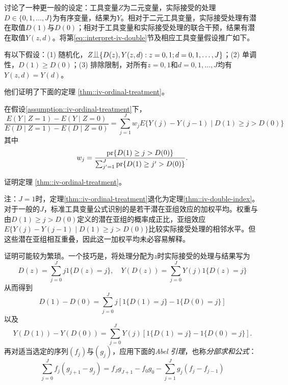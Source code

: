 \citet{angrist1995two}讨论了一种更一般的设定：工具变量$Z$为二元变量，实际接受的处理$D \in \{0,1,\ldots, J\}$为有序变量，结果为$Y$。相对于二元工具变量，实际接受处理有潜在取值$D(1)$与$D(0)$；相对于工具变量和实际接受处理的联合干预，结果有潜在取值$Y(z,d)$。将第\ref{eq::interpret-iv-double}节及相应工具变量假设推广如下。

\begin{assumption}\label{assumption::iv-ordinal-treatment}
有以下假设：(1) 随机化，$Z\ind \{   D(z),  Y(z,d)  : z=0,1; d = 0,1,\ldots, J \}$；(2) 单调性，$D(1) \geq D(0)$；(3) 排除限制，对所有$z=0,1$和$ d = 0,1,\ldots, J $均有$Y(z,d) = Y(d)$。 
\end{assumption}

他们证明了下面的定理 \ref{thm::iv-ordinal-treatment}。

\begin{theorem}\label{thm::iv-ordinal-treatment}
在假设\ref{assumption::iv-ordinal-treatment}下，
$$
\frac{  E(Y\mid Z=1) - E(Y\mid Z=0) }{ E(D\mid Z=1) - E(D\mid Z=0)  }
= \sum_{j=1}^J  w_j E\{  Y(j) - Y(j-1)  \mid D(1) \geq j > D(0) \}
$$
其中
$$
w_j = \frac{   \textup{pr}\{  D(1) \geq j > D(0)   \}   }{   \sum_{j'=1}^J  \textup{pr}\{  D(1) \geq j' > D(0)   \}   }.
$$
\end{theorem}



证明定理 \ref{thm::iv-ordinal-treatment}。

注：$J=1$时，定理\ref{thm::iv-ordinal-treatment}退化为定理\ref{thm::iv-double-index}。对于一般的$J$，标准工具变量公式识别的是若干潜在亚组效应的加权平均。权重与由$  D(1) \geq j > D(0) $定义的潜在亚组的概率成正比，亚组效应$E\{  Y(j) - Y(j-1)  \mid D(1) \geq j > D(0) \}$比较实际接受处理的相邻水平。但这些潜在亚组相互重叠，因此这一加权平均未必容易解释。



证明可能较为繁琐。一个技巧是，将处理分配为$z$时实际接受的处理与结果写为
$$
D(z) = \sum_{j=0}^J j 1\{ D(z) = j\} ,\quad 
Y(D(z)) = \sum_{j=0}^J  Y(j)1\{ D(z) = j\} 
$$
从而得到
$$
D(1) - D(0) = \sum_{j=0}^J j [ 1\{ D(1) = j\} -1\{ D(0) = j\} ]
$$
以及
$$
 Y(D(1))  - Y(D(0))   = 
\sum_{j=0}^J Y(j)   [ 1\{ D(1) = j \}   - 1\{ D(0) = j \}  ].
$$
再对适当选定的序列$(f_j)$与$(g_j)$，应用下面的{\it Abel 引理}，也称{\it 分部求和公式}：
$$
\sum_{j=0}^J  f_j (g_{j+1} - g_j) 
= 
f_J g_{J+1} - f_0 g_0  - \sum_{j=1}^J g_j  (f_j - f_{j-1})
$$ 





 
 


